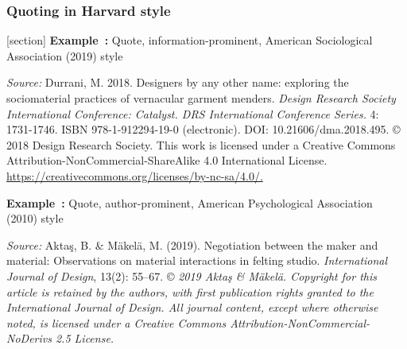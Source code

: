 \documentclass[english, 12pt, a4paper, elec, utf8, a-2b, online]{aaltothesis}
\begin{document}
\subsubsection*{Quoting in Harvard style}

[section]
\textsf{\textbf{Example~\theexample:}} Quote, information-prominent, American 
Sociological Association (2019) style

\vspace{1ex}
\noindent
{}

\vspace{1ex}
\noindent
\textit{Source:} Durrani, M. 2018. Designers by any other name: exploring the 
sociomaterial practices of vernacular garment menders. \textit{Design Research 
Society International Conference: Catalyst. DRS International Conference 
Series.} 4: 1731-1746. ISBN 978-1-912294-19-0 (electronic). 
DOI: 10.21606/dma.2018.495. \copyright{} 2018 Design Research Society. This work
is licensed under a Creative Commons Attribution-NonCommercial-ShareAlike 4.0 
International License. \url{https://creativecommons.org/licenses/by-nc-sa/4.0/.}

\vspace{1em}
\noindent
{}
\textsf{\textbf{Example~\theexample:}} Quote, author-prominent, American 
Psychological Association (2010) style

\vspace{1ex}
\noindent
{}

\vspace{1ex}
\noindent
\textit{Source:} Aktaş, B. \& Mäkelä, M. (2019). Negotiation between the maker 
and material: Observations on material interactions in felting studio. 
\textit{International Journal of Design}, 13(2): 55--67. \copyright{} 
\textit{2019 Aktaş \& Mäkelä. Copyright for this article is retained by the 
	authors, with first publication rights granted to the International Journal 
	of Design. All journal content, except where otherwise noted, is licensed 
	under a Creative Commons Attribution-NonCommercial-NoDerivs 2.5 License.}
\end{document}
